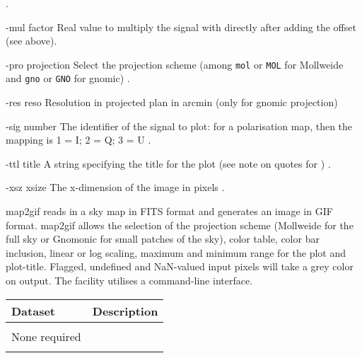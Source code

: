 \begin{qualifiers}
\begin{qulist}{}
     .
%
    \item[{-mul factor}]
 Real value to multiply the signal with directly after
      adding the offset (see above).
%
    \item[{-pro projection}]
 Select the projection scheme 
	(among \texttt{mol} or \texttt{MOL} for Mollweide and \texttt{gno} or \texttt{GNO} for gnomic)
	.
%
    \item[{-res reso}]
 Resolution in projected plan in arcmin (only for gnomic projection) 
%
    \item[{-sig number}]
 The identifier of the signal to plot: for a
      polarisation map, then the mapping is 1 = I; 2 = Q; 3 = U
      .
%
    \item[{-ttl title}]
 A string specifying the title for the plot (see note on quotes for 
) \nodefault.
%
    \item[{-xsz xsize}]
 The x-dimension of the image in pixels .
  \end{qulist}
\end{qualifiers}

\begin{codedescription}
{map2gif reads in a \healpix sky map in FITS format and generates an
image in GIF format. map2gif allows the selection of the projection
scheme (Mollweide for the full sky or Gnomonic for small patches of the sky), color
table, color bar inclusion, linear or log scaling, maximum and 
minimum range for the plot and plot-title. 
Flagged, undefined and NaN-valued input pixels will take a grey color on output. 
The facility utilises a command-line interface.}
\end{codedescription}

\begin{datasets}
{
\begin{tabular}{p{0.3\hsize} p{0.35\hsize}} \hline  
  \textbf{Dataset} & \textbf{Description} \\ \hline
                   &                      \\ %
  None required & \\ 
                   &                      \\ \hline %
\end{tabular}
} 
\end{datasets}

